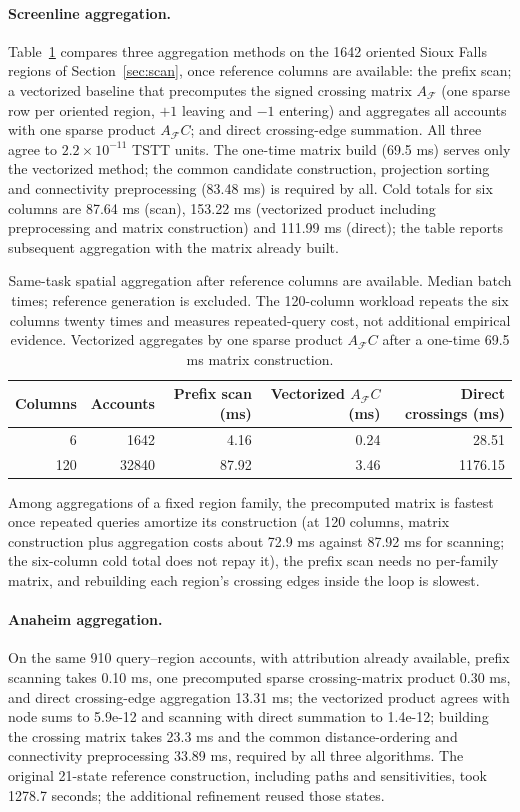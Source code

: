 \paragraph{Screenline aggregation.}
Table~\ref{tab:scan} compares three aggregation methods on the 1642
oriented Sioux Falls regions of Section~\ref{sec:scan}, once reference
columns are available: the prefix scan; a vectorized baseline that
precomputes the signed crossing matrix $A_{\mathcal F}$ (one sparse row
per oriented region, $+1$ leaving and $-1$ entering) and aggregates
all accounts with one sparse product $A_{\mathcal F}C$; and direct
crossing-edge summation. All three agree to $2.2\times10^{-11}$ TSTT
units. The one-time matrix build (69.5 ms) serves only the vectorized
method; the common candidate construction, projection sorting and
connectivity preprocessing (83.48 ms) is required by all. Cold totals
for six columns are 87.64 ms (scan), 153.22 ms (vectorized product
including preprocessing and matrix construction) and 111.99 ms
(direct); the table reports subsequent aggregation with the matrix
already built.
\begin{table}[pos=t]\centering\small\caption{Same-task spatial aggregation after reference columns are available. Median batch times; reference generation is excluded. The 120-column workload repeats the six columns twenty times and measures repeated-query cost, not additional empirical evidence. Vectorized aggregates by one sparse product $A_{\mathcal F}C$ after a one-time 69.5 ms matrix construction.}\label{tab:scan}\begin{tabular}{rrrrr}\toprule Columns & Accounts & Prefix scan (ms) & Vectorized $A_{\mathcal F}C$ (ms) & Direct crossings (ms)\\\midrule
6 & 1642 & 4.16 & 0.24 & 28.51\\
120 & 32840 & 87.92 & 3.46 & 1176.15\\
\bottomrule\end{tabular}\end{table}
Among aggregations of a fixed region family, the precomputed matrix is
fastest once repeated queries amortize its construction (at 120
columns, matrix construction plus aggregation costs about 72.9 ms
against 87.92 ms for scanning; the six-column cold total does not
repay it), the prefix scan needs no per-family matrix, and rebuilding
each region's crossing edges inside the loop is slowest.

\paragraph{Anaheim aggregation.}
On the same 910 query--region accounts, with attribution already
available, prefix scanning takes 0.10 ms, one precomputed sparse
crossing-matrix product 0.30 ms, and direct crossing-edge aggregation
13.31 ms; the vectorized product agrees with node sums to 5.9e-12 and
scanning with direct summation to 1.4e-12; building the crossing
matrix takes 23.3 ms and the common distance-ordering and connectivity
preprocessing 33.89 ms, required by all three algorithms. The original
21-state reference construction, including paths and sensitivities,
took 1278.7 seconds; the additional refinement reused those states.








